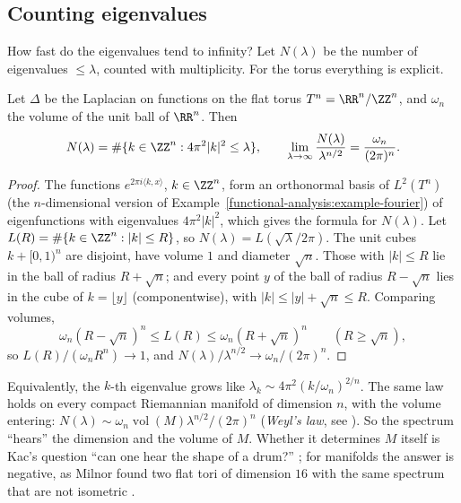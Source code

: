 \subsection{Counting eigenvalues}\label{elliptic-operators:subsection-weyl}

How fast do the eigenvalues tend to infinity? Let $N(\lambda)$ be the number of eigenvalues $\leq \lambda$, counted with multiplicity. For the torus everything is explicit.

\begin{proposition}\label{elliptic-operators:proposition-weyl-torus}
Let $\Delta$ be the Laplacian on functions on the flat torus $T^n = \RR^n/\ZZ^n$, and $\omega_n$ the volume of the unit ball of $\RR^n$. Then
\[
N(\lambda) = \#\{k \in \ZZ^n : 4\pi^2|k|^2 \leq \lambda\}, \qquad \lim_{\lambda \to \infty}\frac{N(\lambda)}{\lambda^{n/2}} = \frac{\omega_n}{(2\pi)^n}.
\]
\end{proposition}

\begin{proof}
The functions $e^{2\pi i\langle k, x\rangle}$, $k \in \ZZ^n$, form an orthonormal basis of $L^2(T^n)$ (the $n$-dimensional version of Example~\ref{functional-analysis:example-fourier}) of eigenfunctions with eigenvalues
$4\pi^2|k|^2$, which gives the formula for $N(\lambda)$. Let $L(R) = \#\{k \in \ZZ^n : |k| \leq R\}$, so $N(\lambda) = L(\sqrt\lambda/2\pi)$. The unit cubes $k + [0, 1)^n$ are disjoint, have volume $1$ and diameter $\sqrt n$. Those with
$|k| \leq R$ lie in the ball of radius $R + \sqrt n$; and every point $y$ of the ball of radius $R - \sqrt n$ lies in the cube of $k = \lfloor y\rfloor$ (componentwise), with $|k| \leq |y| + \sqrt n \leq R$. Comparing volumes,
\[
\omega_n(R - \sqrt n)^n \leq L(R) \leq \omega_n(R + \sqrt n)^n \qquad (R \geq \sqrt n),
\]
so $L(R)/(\omega_nR^n) \to 1$, and $N(\lambda)/\lambda^{n/2} \to \omega_n/(2\pi)^n$.
\end{proof}

Equivalently, the $k$-th eigenvalue grows like $\lambda_k \sim 4\pi^2(k/\omega_n)^{2/n}$. The same law holds on every compact Riemannian manifold of dimension $n$, with the volume entering:
$N(\lambda) \sim \omega_n\operatorname{vol}(M)\lambda^{n/2}/(2\pi)^n$ (\emph{Weyl's law}, see \cite{kac-1966}). So the spectrum ``hears'' the dimension and the volume of $M$. Whether it determines $M$ itself is Kac's
question ``can one hear the shape of a drum?'' \cite{kac-1966}; for manifolds the answer is negative, as Milnor found two flat tori of dimension $16$ with the same spectrum that are not isometric
\cite{milnor-1964}.

